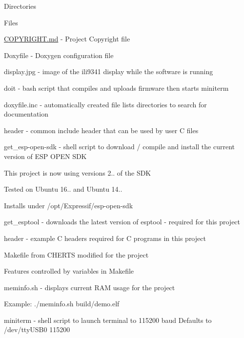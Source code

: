 \begin{DoxyParagraph}{Directories}

\begin{DoxyItemize}
\item Files
\begin{DoxyItemize}
\item \hyperlink{COPYRIGHT_8md}{C\+O\+P\+Y\+R\+I\+G\+H\+T.\+md} -\/ Project Copyright file
\item Doxyfile -\/ Doxygen configuration file
\item display.\+jpg -\/ image of the ili9341 display while the software is running
\item doit -\/ bash script that compiles and uploads firmware then starts miniterm
\item doxyfile.\+inc -\/ automatically created file lists directories to search for documentation
\item header -\/ common include header that can be used by user C files
\item get\+\_\+esp-\/open-\/sdk -\/ shell script to download / compile and install the current version of E\+SP O\+P\+EN S\+DK
\begin{DoxyItemize}
\item This project is now using versions 2.. of the S\+DK
\item Tested on Ubuntu 16.. and Ubuntu 14..
\item Installs under /opt/\+Expressif/esp-\/open-\/sdk
\end{DoxyItemize}
\item get\+\_\+esptool -\/ downloads the latest version of esptool -\/ required for this project
\item header -\/ example C headers required for C programs in this project
\item Makefile from C\+H\+E\+R\+TS modified for the project
\begin{DoxyItemize}
\item Features controlled by variables in Makefile
\end{DoxyItemize}
\item meminfo.\+sh -\/ displays current R\+AM usage for the project
\begin{DoxyItemize}
\item Example\+: ./meminfo.sh build/demo.\+elf
\end{DoxyItemize}
\item miniterm -\/ shell script to launch terminal to 115200 baud Defaults to /dev/tty\+U\+S\+B0 115200

\end{DoxyItemize}
\end{DoxyItemize}
\end{DoxyParagraph}
